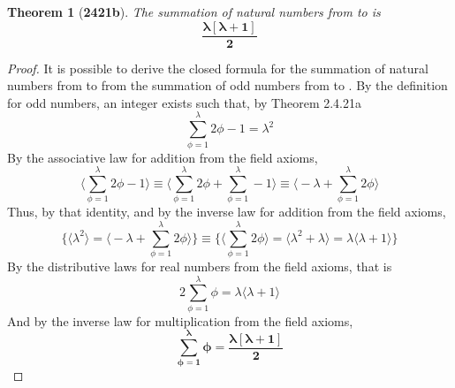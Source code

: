 \documentclass[preview]{standalone}
\newtheorem{theorem}{Theorem}
\begin{document}
\begin{theorem}[\textbf{2421b}]
    The summation of natural numbers from  to \bm{$\lambda$} 
    is 
    \begin{equation*}
        \bm{
            \frac{ \lambda [ \lambda + 1 ]}{2}
        }
    \end{equation*}
\end{theorem}

\begin{proof}
    It is possible to derive the closed formula for the summation of natural numbers
    from  to \bm{$\lambda$} 
    from the summation of odd numbers from  to \bm{$\lambda$}.
    By the definition for odd numbers, 
    an integer \bm{$\phi$} exists such that,
    by Theorem 2.4.21a
    \begin{equation*}
        \sum_{\phi=1}^\lambda 2 \phi - 1 
            = 
        \lambda ^2
    \end{equation*}
    By the associative law for addition from the field axioms,
    \begin{equation*}
        \bigg \langle \sum_{\phi=1}^\lambda 2 \phi - 1 \bigg \rangle
            \equiv
        \bigg \langle 
            \sum_{\phi=1}^\lambda 2 \phi 
                +
            \sum_{\phi=1}^\lambda - 1
        \bigg \rangle
            \equiv
        \bigg \langle 
            -\lambda 
                +
            \sum_{\phi=1}^\lambda 2 \phi 
        \bigg \rangle
    \end{equation*}
    Thus, by that identity, and by the inverse law for addition from the field axioms,
    \begin{equation*}
        \Bigg\{
            \bigg \langle \lambda ^2 \bigg \rangle
                = 
            \bigg \langle 
                -\lambda 
                    + 
                \sum_{\phi=1}^\lambda 2 \phi 
            \bigg \rangle
        \Bigg\}
            \equiv 
        \Bigg\{
            \bigg \langle \sum_{\phi=1}^\lambda 2 \phi \bigg \rangle 
                = 
            \bigg \langle \lambda ^2 + \lambda \bigg \rangle 
                = 
            \lambda \bigg \langle \lambda + 1 \bigg \rangle
        \Bigg\}
    \end{equation*}
    By the distributive laws for real numbers from the field axioms, that is
    \begin{equation*}
        2 \sum_{\phi=1}^\lambda \phi 
            = 
        \lambda \Big \langle \lambda + 1 \Big \rangle
    \end{equation*} 
    And by the inverse law for multiplication from the field axioms,
    \begin{equation*}
        \bm{
            \sum_{\phi=1}^\lambda \phi 
                = 
            \frac{ \lambda [ \lambda + 1 ] }{2}
        }
    \end{equation*}
\end{proof}
\end{document}
